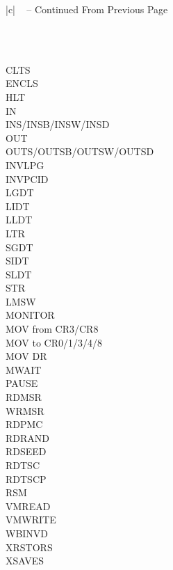 \documentclass{report}
\begin{document}
\begin{spacing}{1.5}
{\begin{longtable}{|c|}
%
{{\tablename\ \thetable{} -- Continued From Previous Page}} \\
\hline {} \\ \hline 
\endhead

\hline {} \\ \hline
\endfoot

\hline \hline
\endlastfoot

\large{CLTS} \\
\large{ENCLS} \\
\large{HLT} \\
\large{IN } \\
\large{INS/INSB/INSW/INSD } \\
\large{OUT} \\
\large{OUTS/OUTSB/OUTSW/OUTSD} \\
\large{INVLPG } \\
\large{INVPCID} \\
\large{LGDT} \\
\large{LIDT} \\
\large{LLDT} \\
\large{LTR} \\
\large{SGDT} \\
\large{SIDT} \\
\large{SLDT} \\
\large{STR} \\
\large{LMSW } \\
\large{MONITOR } \\
\large{MOV from CR3/CR8 } \\
\large{MOV to CR0/1/3/4/8 } \\
\large{MOV DR} \\
\large{MWAIT} \\
\large{PAUSE} \\
\large{RDMSR} \\
\large{WRMSR} \\
\large{RDPMC} \\
\large{RDRAND} \\
\large{RDSEED} \\
\large{RDTSC} \\
\large{RDTSCP} \\
\large{RSM} \\
\large{VMREAD} \\
\large{VMWRITE} \\
\large{WBINVD} \\
\large{XRSTORS} \\
\large{XSAVES} \\



\end{longtable}}
\end{spacing}
\end{document}
